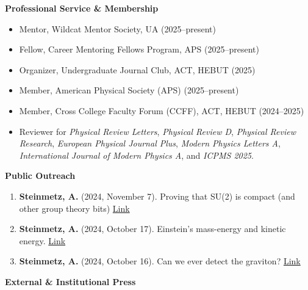 \documentclass[11pt]{article}
\begin{document}
{\large\textbf{Professional Service \& Membership}}

\begin{itemize}[leftmargin=*,nosep]
    \item Mentor, Wildcat Mentor Society, UA (2025--present)
    \item Fellow, Career Mentoring Fellows Program, APS (2025--present)
    \item Organizer, Undergraduate Journal Club, ACT, HEBUT (2025)
    \item Member, American Physical Society (APS) (2025--present)
    \item Member, Cross College Faculty Forum (CCFF), ACT, HEBUT (2024--2025)
    \item Reviewer for \textit{Physical Review Letters}, \textit{Physical Review D}, \textit{Physical Review Research}, \textit{European Physical Journal Plus}, \textit{Modern Physics Letters A}, \textit{International Journal of Modern Physics A}, and \textit{ICPMS 2025}.
\end{itemize}

{\large\textbf{Public Outreach}}

\begin{enumerate}[leftmargin=*,nosep]
    \item \textbf{Steinmetz, A.} (2024, November 7). Proving that SU(2) is compact (and other group theory bits) \href{https://ajsteinmetz.github.io/mathematics/2024/11/07/su2-compactness.html}{Link}
    \item \textbf{Steinmetz, A.} (2024, October 17). Einstein’s mass-energy and kinetic energy. \href{https://ajsteinmetz.github.io/physics/2024/10/17/kinetic-energy-coefficient.html}{Link}
    \item \textbf{Steinmetz, A.} (2024, October 16). Can we ever detect the graviton? \href{https://ajsteinmetz.github.io/physics/2024/10/16/graviton-detector.html}{Link}
\end{enumerate}

\medskip

{\Large\textbf{External \& Institutional Press}}
\end{document}
